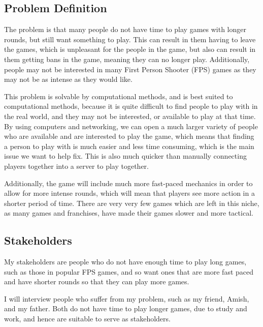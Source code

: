 \subsection{Problem Definition}

The problem is that many people do not have time to play games with longer rounds, but still want something to play. This can result in them having to leave the games, which is unpleasant for the people in the game, but also can result in them getting bans in the game, meaning they can no longer play. Additionally, people may not be interested in many First Person Shooter (FPS) games as they may not be as intense as they would like. 


\vspace{11pt}
This problem is solvable by computational methods, and is best suited to computational methods, because it is quite difficult to find people to play with in the real world, and they may not be interested, or available to play at that time. By using computers and networking, we can open a much larger variety of people who are available and are interested to play the game, which means that finding a person to play with is much easier and less time consuming, which is the main issue we want to help fix. This is also much quicker than manually connecting players together into a server to play together. 


\vspace{11pt}
Additionally, the game will include much more fast-paced mechanics in order to allow for more intense rounds, which will mean that players see more action in a shorter period of time. There are very very few games which are left in this niche, as many games and franchises, have made their games slower and more tactical.

\subsection{Stakeholders}

My stakeholders are people who do not have enough time to play long games, such as those in popular FPS games, and so want ones that are more fast paced and have shorter rounds so that they can play more games.


\vspace{11pt}
I will interview people who suffer from my problem, such as my friend, Amish, and my father. Both do not have time to play longer games, due to study and work, and hence are suitable to serve as stakeholders.


